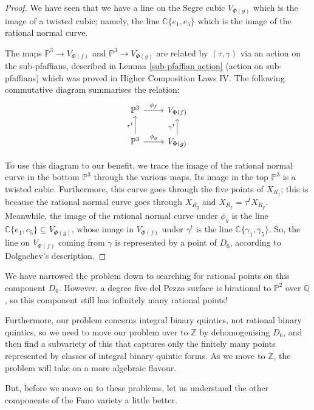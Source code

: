 \documentclass{report}
\begin{document}
\begin{proof}
We have seen that we have a line on the Segre cubic $V_{\Phi(g)}$ which is the image of a twisted cubic; namely, the line $\mathbb{C}\{e_1, e_5\}$ which is the image of the rational normal curve.

The maps $\mathbb{P}^3 \to V_{\Phi(f)}$ and $\mathbb{P}^3 \to V_{\Phi(g)}$ are related by $(\tau,\gamma)$ via an action on the sub-pfaffians, described in Lemma \ref{sub-pfaffian action} (action on sub-pfaffians) which was proved in Higher Composition Laws IV.  The following commutative diagram summarises the relation:
\begin{equation}
\begin{tikzcd}
\mathbb{P}^3 \arrow[r, "\phi_f"] & V_{\Phi(f)} \\
\mathbb{P}^3 \arrow[r, "\phi_g"] \arrow[u, "\tau^t"] & V_{\Phi(g)} \arrow[u, "\gamma^t"]
\end{tikzcd}
\end{equation}

To use this diagram to our benefit, we trace the image of the rational normal curve in the bottom $\mathbb{P}^3$ through the various maps.  Its image in the top $\mathbb{P}^3$ is a twisted cubic.  Furthermore, this curve goes through the five points of $X_{R_f}$; this is because the rational normal curve goes through $X_{R_g}$ and $X_{R_f} = \tau^t X_{R_g}$.  Meanwhile, the image of the rational normal curve under $\phi_g$ is the line $\mathbb{C}\{e_1, e_5\} \subseteq V_{\Phi(g)}$, whose image in $V_{\Phi(f)}$ under $\gamma^t$ is the line $\mathbb{C}\{\gamma_1,\gamma_5\}$.  So, the line on $V_{\Phi(f)}$ coming from $\gamma$ is represented by a point of $D_6$, according to Dolgachev's description.
\end{proof}

We have narrowed the problem down to searching for rational points on this component $D_6$.  However, a degree five del Pezzo surface is birational to $\mathbb{P}^2$ over $\mathbb{Q}$, so this component still has infinitely many rational points!

Furthermore, our problem concerns integral binary quintics, not rational binary quintics, so we need to move our problem over to $\mathbb{Z}$ by dehomogenising $D_6$, and then find a subvariety of this that captures only the finitely many points represented by classes of integral binary quintic forms.  As we move to $\mathbb{Z}$, the problem will take on a more algebraic flavour.

But, before we move on to these problems, let us understand the other components of the Fano variety a little better.
\end{document}
